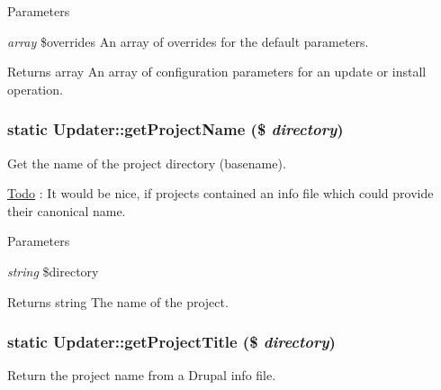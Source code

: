 \begin{DoxyParams}{Parameters}
\item[{\em array}]\$overrides An array of overrides for the default parameters.\end{DoxyParams}
\begin{DoxyReturn}{Returns}
array An array of configuration parameters for an update or install operation. 
\end{DoxyReturn}
\hypertarget{classUpdater_a092911b55da504e51b523dce6307b948}{
\subsubsection[{getProjectName}]{\setlength{\rightskip}{0pt plus 5cm}static Updater::getProjectName (\$ {\em directory})}}
\label{classUpdater_a092911b55da504e51b523dce6307b948}
Get the name of the project directory (basename).

\begin{Desc}
\item[\hyperlink{todo__todo000009}{Todo}]: It would be nice, if projects contained an info file which could provide their canonical name.\end{Desc}

\begin{DoxyParams}{Parameters}
\item[{\em string}]\$directory\end{DoxyParams}
\begin{DoxyReturn}{Returns}
string The name of the project. 
\end{DoxyReturn}
\hypertarget{classUpdater_ae54d59f8b1bc166661a9393004c2d5f1}{
\subsubsection[{getProjectTitle}]{\setlength{\rightskip}{0pt plus 5cm}static Updater::getProjectTitle (\$ {\em directory})}}
\label{classUpdater_ae54d59f8b1bc166661a9393004c2d5f1}
Return the project name from a Drupal info file.


